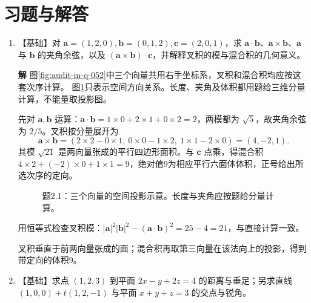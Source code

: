 \documentclass[11pt,openany,fontset=fandol]{ctexbook}
\theoremstyle{plain}\newtheorem{theorem}{定理}[chapter]\newtheorem{proposition}[theorem]{命题}
\theoremstyle{definition}\newtheorem{definition}{定义}[chapter]\newtheorem{example}{例}[chapter]
\theoremstyle{remark}\newtheorem*{remark}{说明}
\newcommand{\SolutionStart}{\par\nobreak\medskip\nobreak\noindent\textbf{解}\quad\ignorespaces}
\newenvironment{solution}{\SolutionStart}{\par\medskip}
\newcommand{\vct}[1]{\bm{#1}}\newcommand{\Rea}{\operatorname{Re}}\newcommand{\Ima}{\operatorname{Im}}
\begin{document}
\section*{习题与解答}
\begin{enumerate}[label=2.\arabic*]
\item \begin{minipage}[t]{\linewidth}
【基础】对 $\vct a=(1,2,0),\vct b=(0,1,2),\vct c=(2,0,1)$，求 $\vct a\cdot\vct b$、$\vct a\times\vct b$、$\vct a$ 与 $\vct b$ 的夹角余弦，以及 $(\vct a\times\vct b)\cdot\vct c$，并解释叉积的模与混合积的几何意义。

\end{minipage}

\begin{solution}
图\ref{fig:audit-m-q-052}中三个向量共用右手坐标系，叉积和混合积均应按这套次序计算。
图\ref{fig:ex-2-1}只表示空间方向关系。长度、夹角及体积都用题给三维分量计算，不能量取投影图。

先对 $\vct a,\vct b$ 运算：$\vct a\cdot\vct b=1\times0+2\times1+0\times2=2$，两模都为 $\sqrt5$，故夹角余弦为 $2/5$。叉积按分量展开为
\[
\vct a\times\vct b=(2\times2-0\times1,\ 0\times0-1\times2,\ 1\times1-2\times0)
=(4,-2,1).
\]
其模 $\sqrt{21}$ 是两向量张成的平行四边形面积。与 $\vct c$ 点乘，得混合积 $4\times2+(-2)\times0+1\times1=9$，绝对值9为相应平行六面体体积，正号给出所选次序的定向。

\begin{figure}[H]\centering
{}
\caption{题2.1：三个向量的空间投影示意。长度与夹角应按题给分量计算。}\label{fig:ex-2-1}
\end{figure}

用恒等式检查叉积模：$|\vct a|^2|\vct b|^2-(\vct a\cdot\vct b)^2=25-4=21$，与直接计算一致。

叉积垂直于前两向量张成的面；混合积再取第三向量在该法向上的投影，得到带定向的体积9。
\end{solution}

\item \begin{minipage}[t]{\linewidth}
【基础】求点 $(1,2,3)$ 到平面 $2x-y+2z=4$ 的距离与垂足；另求直线 $(1,0,0)+t(1,2,-1)$ 与平面 $x+y+z=3$ 的交点与锐角。


\end{minipage}
\end{enumerate}
\end{document}
